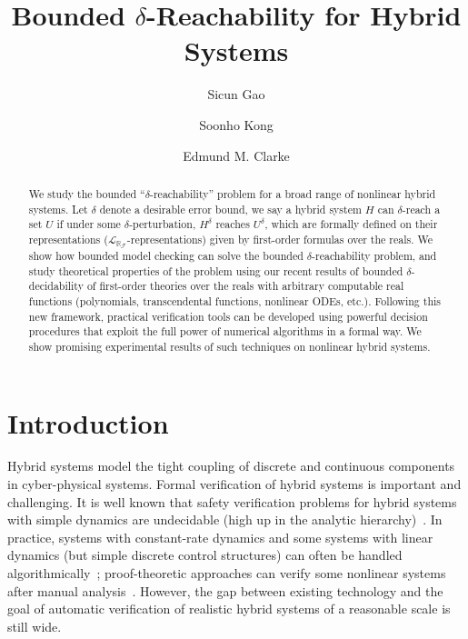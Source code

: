 \documentclass[envcountsect]{llncs}
\title{Bounded $\delta$-Reachability for Hybrid Systems}
\author{Sicun Gao \and Soonho Kong \and Edmund M. Clarke}
\institute{Carnegie Mellon University, Pittsburgh, PA 15213}
\newcommand{\lrf}{\mathcal{L}_{\mathbb{R}_{\mathcal{F}}}}
\begin{document}
\maketitle

\begin{abstract}
We study the bounded ``$\delta$-reachability'' problem for a broad
range of nonlinear hybrid systems. Let $\delta$ denote
a desirable error bound, we say a hybrid system $H$ can $\delta$-reach a set
$U$ if under some $\delta$-perturbation, $H^{\delta}$ reaches
$U^{\delta}$, which are formally defined on their representations
($\lrf$-representations) given by first-order formulas over the reals. We show
how bounded model checking can solve the bounded $\delta$-reachability problem,
and study theoretical properties of the problem using our recent
results of bounded $\delta$-decidability of first-order theories over the reals
with arbitrary computable real functions (polynomials, transcendental functions,
nonlinear ODEs, etc.). Following this new framework, practical verification
tools can be developed using powerful decision procedures that exploit
the full power of numerical algorithms in a formal way. We show promising
experimental results of such techniques on nonlinear hybrid systems. 

\end{abstract}

\section{Introduction}

Hybrid systems model the tight coupling of discrete and continuous components
in cyber-physical systems. Formal verification of hybrid systems is
important and challenging. It is well known that safety verification
problems for hybrid systems with simple dynamics are undecidable (high up in the
analytic
hierarchy)~\cite{DBLP:journals/tse/AlurHH96,DBLP:journals/jcss/HenzingerKPV98,DBLP:journals/tcs/Bournez99}. In practice, systems
with constant-rate dynamics
and some systems with linear dynamics (but simple discrete control structures)
can often be handled
algorithmically~\cite{DBLP:journals/tse/AlurHH96,lpw:sttt97,DBLP:conf/hybrid/ChutinanK99,DBLP:conf/hybrid/AsarinDMB00,DBLP:conf/cav/AsarinDM02,DBLP:conf/hybrid/GirardGM06,DBLP:conf/cav/GuernicG09}; proof-theoretic
approaches can verify some nonlinear systems after manual analysis~\cite{DBLP:journals/logcom/Platzer10,DBLP:conf/hybrid/Sankaranarayanan10}.
However, the gap between existing technology
and the goal of automatic verification of realistic hybrid systems of a
reasonable scale is still wide.
\end{document}
